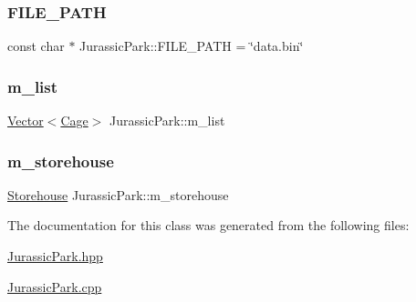 \subsubsection{\texorpdfstring{F\+I\+L\+E\+\_\+\+P\+A\+TH}{FILE\_PATH}}
{\footnotesize\ttfamily const char $\ast$ Jurassic\+Park\+::\+F\+I\+L\+E\+\_\+\+P\+A\+TH = \char`\"{}data.\+bin\char`\"{}\hspace{0.3cm}{\ttfamily [static]}}

\mbox{\label{classJurassicPark_aff664f70b0ab4d0287107b83f1c5e89a}} 
\subsubsection{\texorpdfstring{m\+\_\+list}{m\_list}}
{\footnotesize\ttfamily \hyperlink{classVector}{Vector}$<$\hyperlink{classCage}{Cage}$>$ Jurassic\+Park\+::m\+\_\+list\hspace{0.3cm}{\ttfamily [private]}}

\mbox{\label{classJurassicPark_af0c4958aa71443927e7fcb9e5da545d3}} 
\subsubsection{\texorpdfstring{m\+\_\+storehouse}{m\_storehouse}}
{\footnotesize\ttfamily \hyperlink{classStorehouse}{Storehouse} Jurassic\+Park\+::m\+\_\+storehouse\hspace{0.3cm}{\ttfamily [private]}}



The documentation for this class was generated from the following files\+:\begin{DoxyCompactItemize}
\item 
\hyperlink{JurassicPark_8hpp}{Jurassic\+Park.\+hpp}\item 
\hyperlink{JurassicPark_8cpp}{Jurassic\+Park.\+cpp}\end{DoxyCompactItemize}
